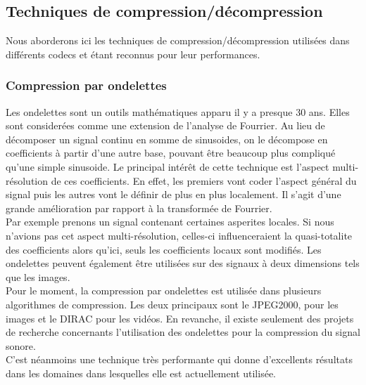 	\subsection{Techniques de compression/décompression}
Nous   aborderons  ici   les  techniques   de  compression/décompression
utilisées   dans  différents   codecs  et   étant  reconnus   pour  leur
performances.

\newpage

		\subsubsection{Compression par ondelettes}
Les ondelettes sont  un outils math\'ematiques apparu il  y a presque 30
ans.  Elles  sont  consider\'ees comme  une  extension  de  l'analyse de
Fourrier.  Au  lieu  de  d\'ecomposer  un  signal  continu  en  somme de
sinusoides,  on le  d\'ecompose en coefficients  \`a partir  d'une autre
base,  pouvant \^etre beaucoup plus compliqu\'e qu'une simple sinusoide.
Le   principal    int\'er\^et   de   cette    technique   est   l'aspect
multi-r\'esolution  de ces  coefficients.  En effet,  les  premiers vont
coder l'aspect g\'en\'eral  du signal puis les autres  vont le d\'efinir
de plus en  plus localement.  Il s'agit d'une  grande am\'elioration par
rapport \`a la transform\'ee de Fourrier.\\
Par exemple prenons un signal contenant certaines asperites locales.  Si
nous   n'avions   pas    cet   aspect   multi-r\'esolution,    celles-ci
influenceraient la quasi-totalite  des coefficients alors qu'ici,  seuls
les  coefficients  locaux   sont  modifi\'es.   Les  ondelettes  peuvent
\'egalement \^etre utilis\'ees sur des  signaux \`a deux dimensions tels
que les images.\\
Pour  le  moment,  la compression  par  ondelettes  est  utilis\'ee dans
plusieurs  algorithmes  de  compression.  Les  deux  principaux  sont le
JPEG2000,  pour les images et le  DIRAC pour les vid\'eos.  En revanche,
il existe  seulement des projets de  recherche concernants l'utilisation
des ondelettes pour la compression du signal sonore.\\
C'est   n\'eanmoins  une   technique   tr\`es   performante   qui  donne
d'excellents r\'esultats  dans  les  domaines  dans  lesquelles elle est
actuellement utilis\'ee.

\newpage

